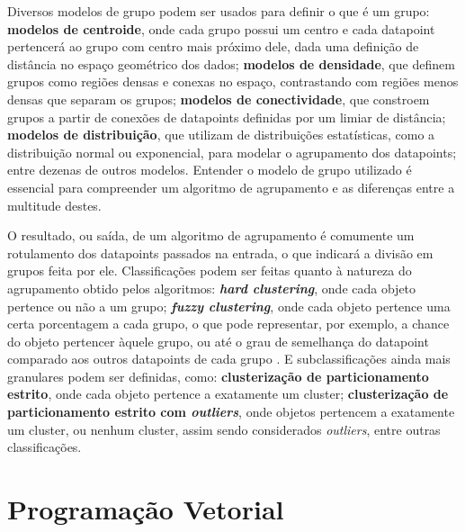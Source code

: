 \documentclass[12pt, %
openright, 
oneside, %
a4paper,    %
brazil]{facom-ufu-abntex2}
\begin{document}


Diversos modelos de grupo podem ser usados para definir o que é um grupo: \textbf{modelos de centroide}, onde cada grupo possui um centro e cada datapoint pertencerá ao grupo com centro mais próximo dele, dada uma definição de distância no espaço geométrico dos dados; \textbf{modelos de densidade}, que definem grupos como regiões densas e conexas no espaço, contrastando com regiões menos densas que separam os grupos; \textbf{modelos de conectividade}, que constroem grupos a partir de conexões de datapoints definidas por um limiar de distância; \textbf{modelos de distribuição}, que utilizam de distribuições estatísticas, como a distribuição normal ou exponencial, para modelar o agrupamento dos datapoints; entre dezenas de outros modelos. Entender o modelo de grupo utilizado é essencial para compreender um algoritmo de agrupamento e as diferenças entre a multitude destes.

O resultado, ou saída, de um algoritmo de agrupamento é comumente um rotulamento dos datapoints passados na entrada, o que indicará a divisão em grupos feita por ele. Classificações podem ser feitas quanto à natureza do agrupamento obtido pelos algoritmos: \textbf{\textit{hard clustering}}, onde cada objeto pertence ou não a um grupo; \textbf{\textit{fuzzy clustering}}, onde cada objeto pertence uma certa porcentagem a cada grupo, o que pode representar, por exemplo, a chance do objeto pertencer àquele grupo, ou até o grau de semelhança do datapoint comparado aos outros datapoints de cada grupo \cite{FuzzyClusteringSurvey}. E subclassificações ainda mais granulares podem ser definidas, como: \textbf{clusterização de particionamento estrito}, onde cada objeto pertence a exatamente um cluster; \textbf{clusterização de particionamento estrito com \textit{outliers}}, onde objetos pertencem a exatamente um cluster, ou nenhum cluster, assim sendo considerados \textit{outliers}, entre outras classificações.




\section{Programação Vetorial}
\end{document}
